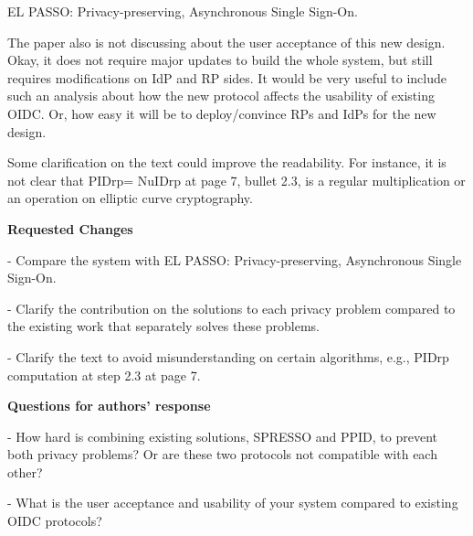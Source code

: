 \documentclass[letterpaper,onecolumn,10pt]{article}
\begin{document}
EL PASSO: Privacy-preserving, Asynchronous Single Sign-On.

The paper also is not discussing about the user acceptance of this new design. Okay, it does not require major updates to build the whole system, but still requires modifications on IdP and RP sides. It would be very useful to include such an analysis about how the new protocol affects the usability of existing OIDC. Or, how easy it will be to deploy/convince RPs and IdPs for the new design.

Some clarification on the text could improve the readability. For instance, it is not clear that PIDrp= NuIDrp at page 7, bullet 2.3, is a regular multiplication or an operation on elliptic curve cryptography.

\vspace{1mm}\noindent\textbf{Requested Changes}


-	Compare the system with EL PASSO: Privacy-preserving, Asynchronous Single Sign-On.

-	Clarify the contribution on the solutions to each privacy problem compared to the existing work that separately solves these problems.

-	Clarify the text to avoid misunderstanding on certain algorithms, e.g., PIDrp computation at step 2.3 at page 7.

\vspace{1mm}\noindent\textbf{Questions for authors' response}


-	How hard is combining existing solutions, SPRESSO and PPID, to prevent both privacy problems? Or are these two protocols not compatible with each other?

-	What is the user acceptance and usability of your system compared to existing OIDC protocols?
\end{document}
